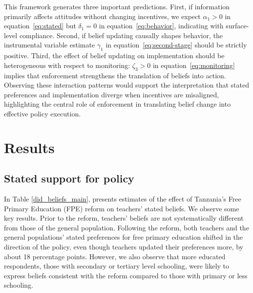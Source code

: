 \documentclass[hidelinks,12pt]{article}
\begin{document}
\begin{singlespace}
This framework generates three  important predictions. First, if information primarily affects attitudes without changing incentives, we expect $\alpha_1>0$ in equation~\eqref{eq:stated} but $\delta_1=0$ in equation~\eqref{eq:behavior}, indicating with surface-level compliance. Second, if belief updating causally shapes behavior, the instrumental variable estimate $\gamma_1$ in equation~\eqref{eq:second-stage} should be strictly positive. Third, the effect of belief updating on implementation should be heterogeneous with respect to monitoring: $\zeta_3>0$ in equation~\eqref{eq:monitoring} implies that enforcement strengthens the translation of beliefs into action. Observing these interaction patterns would support the interpretation that stated preferences and implementation diverge when incentives are misaligned, highlighting the central role of enforcement in translating belief change into effective policy execution.




\section{Results}

\subsection{Stated support for policy}
In Table \ref{did_beliefs_main}, presents estimates of the effect of Tanzania’s Free Primary Education (FPE) reform on teachers’ stated beliefs. We observe some key results. Prior to the reform, teachers’ beliefs are not systematically different from those of the general population. Following the reform, both teachers and the general populations' stated preferences for free primary education shifted in the direction of the policy, even though teachers updated their preferences more, by about 18 percentage points. However, we also observe that more educated respondents, those with secondary or tertiary level schooling, were likely to express beliefs consistent with the reform compared to those with primary or less schooling.



\end{singlespace}
\end{document}
